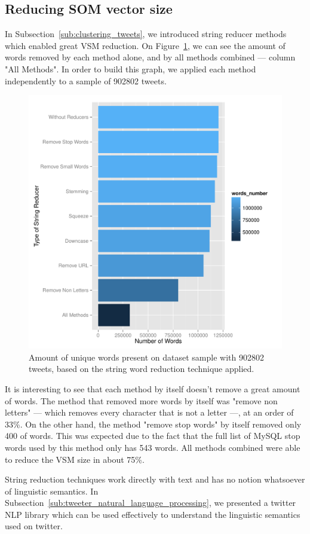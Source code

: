 \subsection{Reducing SOM vector size}
\label{sub:reducing_som_vector_size}
In Subsection~\ref{sub:clustering_tweets}, we introduced string reducer methods which enabled great \ac{VSM} reduction. On Figure~\ref{fig:plot_word_red}, we can see the amount of words removed by each method alone, and by all methods combined --- column "All Methods". In order to build this graph, we applied each method independently to a sample of 902802 tweets.

\begin{figure}[htpb]
  \centering
  \includegraphics[width=0.8\linewidth]{./plots/svm/plot_wordcount.pdf}
  \caption{Amount of unique words present on dataset sample with 902802 tweets, based on the string word reduction technique applied.}
  \label{fig:plot_word_red}
\end{figure}

It is interesting to see that each method by itself doesn't remove a great amount of words. The method that removed more words by itself was "remove non letters" --- which removes every character that is not a letter ---, at an order of 33\%. On the other hand, the method "remove stop words" by itself removed only 400 of words. This was expected due to the fact that the full list of MySQL stop words used by this method only has 543 words. All methods combined were able to reduce the \ac{VSM} size in about 75\%.

String reduction techniques work directly with text and has no notion whatsoever of linguistic semantics. In Subsection~\ref{sub:tweeter_natural_language_processing}, we presented a twitter \ac{NLP} library which can be used effectively to understand the linguistic semantics used on twitter. 

